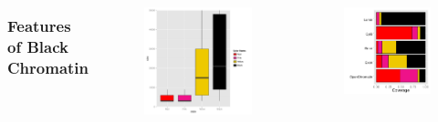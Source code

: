 \documentclass{beamer}
\begin{document}
\begin{frame}
\begin{columns}
\frametitle{Features of Black Chromatin}
		\pause
 		\begin{column}{.5\textwidth}
		\begin{figure}
   			\includegraphics[width=1.\textwidth]{figs/domain_size}
  		\end{figure}
		\end{column}
		
		\pause
		\begin{column}{.5\textwidth}
		\begin{figure}
   			\includegraphics[width=1.\textwidth]{figs/AllFeatureCoverage}
  		\end{figure}
		

\end{column}
\end{columns}
\end{frame}
\end{document}
